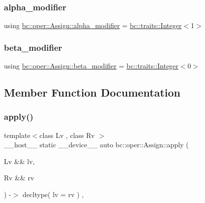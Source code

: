 \subsubsection{\texorpdfstring{alpha\+\_\+modifier}{alpha\_modifier}}
{\footnotesize\ttfamily using \hyperlink{structbc_1_1oper_1_1Assign_a7a864b827a77baa288df5e5a6b812b16}{bc\+::oper\+::\+Assign\+::alpha\+\_\+modifier} =  \hyperlink{structbc_1_1traits_1_1Integer}{bc\+::traits\+::\+Integer}$<$1$>$}

\mbox{\label{structbc_1_1oper_1_1Assign_ae78c3dadc298a7f88f922cc7d1d2c961}} 
\subsubsection{\texorpdfstring{beta\+\_\+modifier}{beta\_modifier}}
{\footnotesize\ttfamily using \hyperlink{structbc_1_1oper_1_1Assign_ae78c3dadc298a7f88f922cc7d1d2c961}{bc\+::oper\+::\+Assign\+::beta\+\_\+modifier} =  \hyperlink{structbc_1_1traits_1_1Integer}{bc\+::traits\+::\+Integer}$<$0$>$}



\subsection{Member Function Documentation}
\mbox{\label{structbc_1_1oper_1_1Assign_a1e478dc4379526354bb93cb91a2cb9a8}} 
\subsubsection{\texorpdfstring{apply()}{apply()}}
{\footnotesize\ttfamily template$<$class Lv , class Rv $>$ \\
\+\_\+\+\_\+host\+\_\+\+\_\+ static \+\_\+\+\_\+device\+\_\+\+\_\+ auto bc\+::oper\+::\+Assign\+::apply (\begin{DoxyParamCaption}\item[{Lv \&\&}]{lv,  }\item[{Rv \&\&}]{rv }\end{DoxyParamCaption}) -\/$>$ decltype( lv = rv ) \hspace{0.3cm}{\ttfamily [inline]}, {\ttfamily [static]}}

